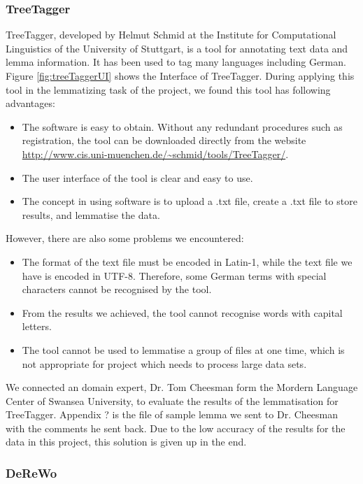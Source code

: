 \subsubsection{TreeTagger}

TreeTagger, developed by Helmut Schmid at the Institute for Computational Linguistics of the University of Stuttgart, is a tool for annotating text data and lemma information. It has been used to tag many languages including German. Figure \ref{fig:treeTaggerUI} shows the Interface of TreeTagger. During applying this tool in the lemmatizing task of the project, we found this tool has following advantages:

\begin{itemize}
	\item \textbf{} The software is easy to obtain. Without any redundant procedures such as registration, the tool can be downloaded directly from the website \url{http://www.cis.uni-muenchen.de/~schmid/tools/TreeTagger/}.
	\item \textbf{} The user interface of the tool is clear and easy to use.
	\item \textbf{} The concept in using software is to upload a .txt file, create a .txt file to store results, and lemmatise the data.	
\end{itemize}

However, there are also some problems we encountered:
\begin{itemize}
	\item \textbf{} The format of the text file must be encoded in Latin-1, while the text file we have is encoded in UTF-8. Therefore, some German terms with special characters cannot be recognised by the tool.
	\item \textbf{} From the results we achieved, the tool cannot recognise words with capital letters. 
	\item \textbf{} The tool cannot be used to lemmatise a group of files at one time, which is not appropriate for project which needs to process large data sets. 	
\end{itemize}

We connected an domain expert, Dr. Tom Cheesman form the Mordern Language Center of Swansea University, to evaluate the results of the lemmatisation for TreeTagger. Appendix {?} is the file of sample lemma we sent to Dr. Cheesman with the comments he sent back. Due to the low accuracy of the results for the data in this project, this solution is given up in the end.

\subsubsection{DeReWo}

